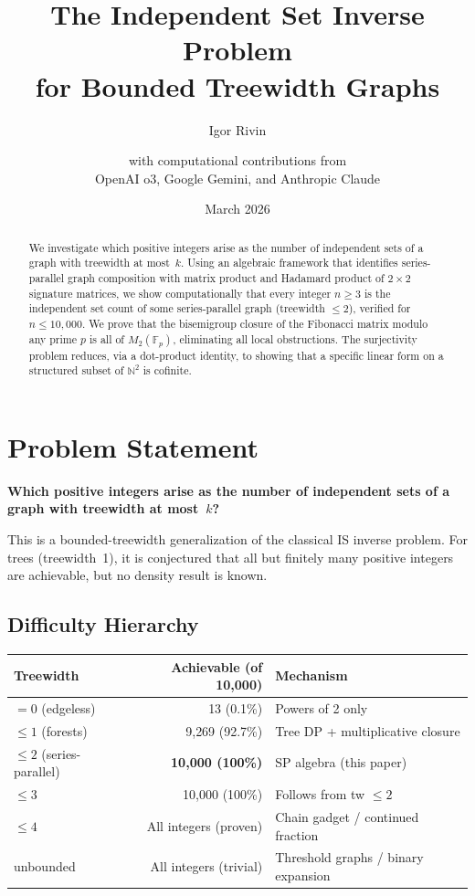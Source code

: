 \documentclass[11pt,a4paper]{article}
\title{The Independent Set Inverse Problem\\for Bounded Treewidth Graphs}
\author{Igor Rivin \and with computational contributions from\\OpenAI o3, Google Gemini, and Anthropic Claude}
\date{March 2026}
\theoremstyle{definition}
\theoremstyle{remark}
\newcommand{\FF}{\mathbb{F}}
\newcommand{\NN}{\mathbb{N}}
\begin{document}
\maketitle

\begin{abstract}
We investigate which positive integers arise as the number of independent sets of a graph with treewidth at most~$k$. Using an algebraic framework that identifies series-parallel graph composition with matrix product and Hadamard product of $2\times 2$ signature matrices, we show computationally that every integer $n \geq 3$ is the independent set count of some series-parallel graph (treewidth $\leq 2$), verified for $n \leq 10{,}000$. We prove that the bisemigroup closure of the Fibonacci matrix modulo any prime $p$ is all of $M_2(\FF_p)$, eliminating all local obstructions. The surjectivity problem reduces, via a dot-product identity, to showing that a specific linear form on a structured subset of $\NN^2$ is cofinite.
\end{abstract}

\tableofcontents

\section{Problem Statement}

\textbf{Which positive integers arise as the number of independent sets of a graph with treewidth at most~$k$?}

This is a bounded-treewidth generalization of the classical IS inverse problem. For trees (treewidth~1), it is conjectured that all but finitely many positive integers are achievable, but no density result is known.

\subsection{Difficulty Hierarchy}

\begin{center}
\begin{tabular}{lrl}
\toprule
Treewidth & Achievable (of 10{,}000) & Mechanism \\
\midrule
$= 0$ (edgeless) & 13 (0.1\%) & Powers of 2 only \\
$\leq 1$ (forests) & 9{,}269 (92.7\%) & Tree DP + multiplicative closure \\
$\leq 2$ (series-parallel) & \textbf{10{,}000 (100\%)} & SP algebra (this paper) \\
$\leq 3$ & 10{,}000 (100\%) & Follows from tw $\leq 2$ \\
$\leq 4$ & All integers (proven) & Chain gadget / continued fraction \\
unbounded & All integers (trivial) & Threshold graphs / binary expansion \\
\bottomrule
\end{tabular}
\end{center}
\end{document}
